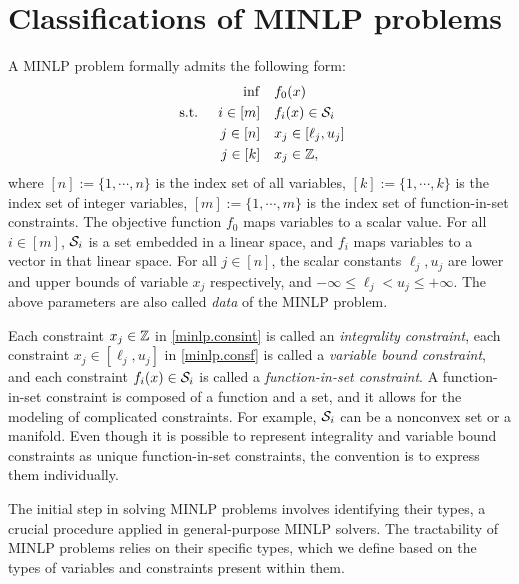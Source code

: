 \section{Classifications of MINLP problems} %
A MINLP problem formally admits the following form:
\begin{subequations}
    \label{minlp}
    \begin{align}
       \inf &  \quad f_0(x) \label{minlp.obj} \\
    \textup{ s.t. } \quad i \in [m] & \quad f_i(x) \in \mathcal S_i  \label{minlp.consf} \\
      j \in [n] &  \quad x_j \in [\ell_j, u_j] \label{minlp.consfbd}\\
      j \in [k] & \quad x_j \in \mathbb Z, \label{minlp.consint}
    \end{align}
    \end{subequations}
where $[n]:=\{1,\cdots,n\}$ is the index set of all variables, $[k]:=\{1,\cdots,k\}$ is the index set of integer variables, $[m]:=\{1,\cdots,m\}$ is the index set of  function-in-set constraints.  The objective function $f_0$ maps  variables to a scalar value. For all $i \in [m]$, $\mathcal S_i$ is a  set embedded in a linear space, and $f_i$ maps variables to a vector in that linear space. For all $j \in [n]$, the scalar constants $\ell_j , u_j$  are lower and upper bounds of variable $x_j$ respectively, and $-\infty \le \ell_j  <  u_j \le +\infty$. The above  parameters are also called \emph{data} of the MINLP problem. 


Each constraint $x_j \in \mathbb Z$ in \eqref{minlp.consint} is called an \emph{integrality constraint}, each constraint $x_j \in [\ell_j, u_j]$ in \eqref{minlp.consf} is called a \emph{variable bound constraint}, and each constraint $f_i(x) \in \mathcal S_i$ is called a \emph{function-in-set  constraint}. A function-in-set  constraint is composed of a function and a set, and it allows for the modeling of complicated constraints. For example, $\mathcal S_i$ can be a nonconvex set or a manifold. Even though it is possible to represent integrality and variable bound constraints as unique function-in-set constraints, the convention is to express them individually.

The initial step in solving MINLP problems involves identifying their types, a crucial procedure applied in general-purpose MINLP solvers. The tractability of MINLP problems relies on their specific types, which we define based on the types of variables and constraints present within them.



